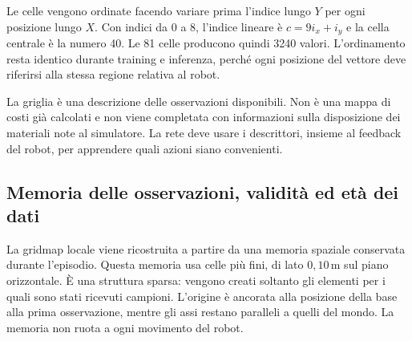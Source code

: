 \begin{table}[tbp]
    \centering
    \caption[Contenuto della cella percettiva]{Organizzazione dei descrittori forniti alla policy. Le maschere distinguono misure valide e dati mancanti, mentre le età indicano quanto sono recenti le osservazioni.}
    \label{tab:metodo-contenuto-cella}
\end{table}

Le celle vengono ordinate facendo variare prima l'indice lungo $Y$ per ogni posizione lungo $X$. Con indici da 0 a 8, l'indice lineare è $c=9i_x+i_y$ e la cella centrale è la numero 40. Le 81 celle producono quindi 3240 valori. L'ordinamento resta identico durante training e inferenza, perché ogni posizione del vettore deve riferirsi alla stessa regione relativa al robot.

La griglia è una descrizione delle osservazioni disponibili. Non è una mappa di costi già calcolati e non viene completata con informazioni sulla disposizione dei materiali note al simulatore. La rete deve usare i descrittori, insieme al feedback del robot, per apprendere quali azioni siano convenienti.

\subsection{Memoria delle osservazioni, validit\`a ed et\`a dei dati}

La gridmap locale viene ricostruita a partire da una memoria spaziale conservata durante l'episodio. Questa memoria usa celle più fini, di lato $0{,}10\,\mathrm{m}$ sul piano orizzontale. È una struttura sparsa: vengono creati soltanto gli elementi per i quali sono stati ricevuti campioni. L'origine è ancorata alla posizione della base alla prima osservazione, mentre gli assi restano paralleli a quelli del mondo. La memoria non ruota a ogni movimento del robot.

